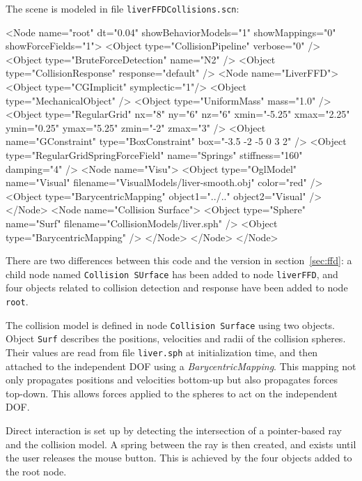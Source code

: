 \documentclass[a4paper,11pt]{article}
\newcommand{\file}[1]{\texttt{#1}}
\newcommand{\xml}[1]{\texttt{#1}}
\begin{document}
The scene is modeled in file \file{liverFFDCollisions.scn}:
\begin{code_xml}
<Node name="root"  dt="0.04" showBehaviorModels="1" showMappings="0" showForceFields="1">
  <Object type="CollisionPipeline" verbose="0" />
  <Object type="BruteForceDetection" name="N2" />
  <Object type="CollisionResponse" response="default" />
	<Node name="LiverFFD">
		<Object type="CGImplicit" symplectic="1"/>
		<Object type="MechanicalObject" />
		<Object type="UniformMass" mass="1.0" />
                <Object type="RegularGrid"
                        nx="8" ny="6" nz="6"
                        xmin="-5.25" xmax="2.25"
                        ymin="0.25" ymax="5.25"
                        zmin="-2" zmax="3"
                        />
		<Object name="GConstraint" type="BoxConstraint"
                        box="-3.5 -2 -5 0 3 2"
                        />
		<Object type="RegularGridSpringForceField" name="Springs" stiffness="160" damping="4" />
		<Node name="Visu">
			<Object type="OglModel" name="Visual" filename="VisualModels/liver-smooth.obj" color="red" />
			<Object type="BarycentricMapping" object1="../.." object2="Visual" />
		</Node>
                <Node name="Collision Surface">
                  <Object type="Sphere" name="Surf" filename="CollisionModels/liver.sph" />
                  <Object type="BarycentricMapping" />
                </Node>
	</Node>
</Node>
\end{code_xml}

There are two differences between this code and the version in section~\ref{sec:ffd}: a child node named \xml{Collision SUrface} has been added to node \xml{liverFFD}, and four objects related to collision detection and response have been added to node \xml{root}.

The collision model is defined in node \xml{Collision Surface} using two objects. Object \xml{Surf} describes the positions, velocities and radii of the collision spheres. Their values are read from file \file{liver.sph} at initialization time, and then attached to the independent DOF using a \emph{BarycentricMapping}. This mapping not only propagates positions and velocities bottom-up but also propagates forces top-down. This allows forces applied to the spheres to act on the independent DOF.

Direct interaction is set up by detecting the intersection of a pointer-based ray and the collision model. A spring between the ray is then created, and exists until the user releases the mouse button. This is achieved by the four objects added to the root node.
\end{document}
